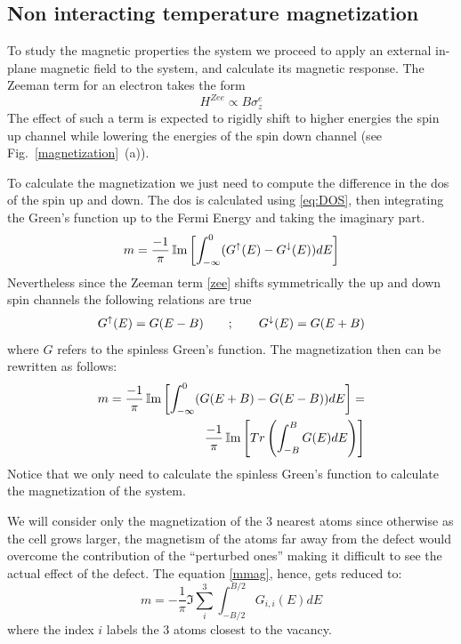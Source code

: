 \subsection{Non interacting temperature magnetization}
To study the magnetic properties the system we proceed to apply an external in-plane magnetic field to the system, and calculate its magnetic response. The Zeeman term for an electron takes the form
\begin{equation}
  H^{Zee} \propto B\sigma^e_{z}
\label{zee}
\end{equation}
The effect of such a term is expected to rigidly shift to higher energies the spin up channel while lowering the energies of the spin down channel (see Fig.~\ref{magnetization}~(a)).

To calculate the magnetization we just need to compute the difference in the \ac{dos} of the spin up and down. The \ac{dos} is calculated using \eqref{eq:DOS}, then integrating the Green's function up to the Fermi Energy and taking the imaginary part.
\begin{equation}
  m = \frac{-1}{\pi}
      \operatorname{\mathbb{I}m}\left[\int^{0}_{-\infty} (G^{\uparrow}(E)-G^{\downarrow}(E))dE\right]
\end{equation}
Nevertheless since the Zeeman term \eqref{zee} shifts symmetrically the up and down spin channels the following relations are true
\begin{equation}
  G^{\uparrow}(E) = G(E-B) \quad\quad;\quad\quad G^{\downarrow}(E) = G(E+B)
\end{equation}
where $G$ refers to the spinless Green's function. The magnetization then can be rewritten as follows:
\begin{equation}
  \begin{split}
      m = \frac{-1}{\pi}\operatorname{\mathbb{I}m}\left[\int^{0}_{-\infty}(G(E+B)-G(E -B))dE\right] =\\
      \frac{-1}{\pi} \operatorname{\mathbb{I}m}\left[Tr\left(\int^{B}_{-B}G(E)dE\right)\right]
  \end{split}
\label{mmag}
\end{equation}
Notice that we only need to calculate the spinless Green's function to calculate the magnetization of the system.

We will consider only the magnetization of the 3 nearest atoms since otherwise as the cell grows larger, the magnetism of the atoms far away from the defect would overcome the contribution of the ``perturbed ones'' making it difficult to see the actual effect of the defect. The equation \eqref{mmag}, hence, gets reduced to:
\begin{equation}
  m = -\frac{1}{\pi}
      \Im{\sum^{3}_{i}\int^{B/2}_{-B/2}G_{i,i}(E)dE}
\label{mag}
\end{equation}
where the index $i$ labels the 3 atoms closest to the vacancy.

